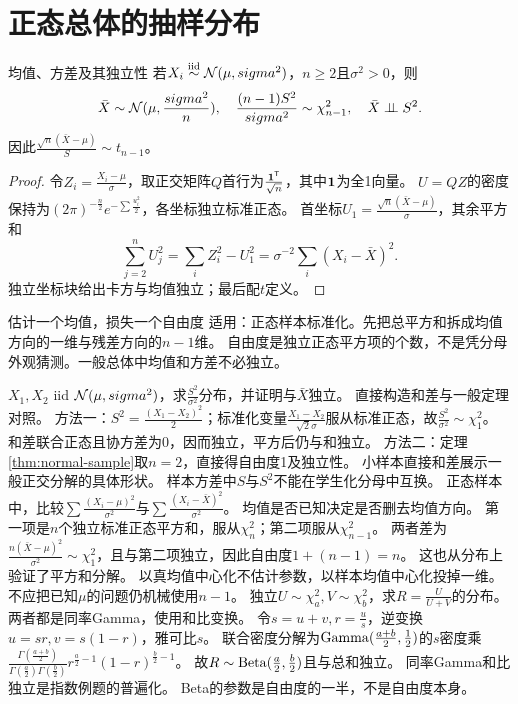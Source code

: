 \section{正态总体的抽样分布}\label{sec:63}
\begin{theorem}{均值、方差及其独立性}\label{thm:normal-sample}
若$X_i\overset{\mathrm{iid}}{\sim}\mathcal N(\mu,sigma^2)$，$n\ge2$且$\sigma^2>0$，则
\[\bar X\sim\mathcal N(\mu,\dfrac{sigma^2}{n}),\quad\dfrac{(n-1)S^2}{sigma^2}\sim\chi_{n-1}^2,
\quad\bar X\mathrel{\perp\!\!\!\perp} S^2.\]
因此$\frac{\sqrt n(\bar X-\mu)}{S}\sim t_{n-1}$。
\end{theorem}
\begin{proof}
令$Z_i=\frac{X_i-\mu}{\sigma}$，取正交矩阵$Q$首行为$\frac{\mathbf1^\mathsf T}{\sqrt n}$，其中$\mathbf1$为全1向量。
$U=QZ$的密度保持为$(2\pi)^{-\frac{n}{2}}e^{-\sum \frac{u_i^2}{2}}$，各坐标独立标准正态。
首坐标$U_1=\frac{\sqrt n(\bar X-\mu)}{\sigma}$，其余平方和
\[\sum_{j=2}^nU_j^2=\sum_iZ_i^2-U_1^2=\sigma^{-2}\sum_i(X_i-\bar X)^2.\]
独立坐标块给出卡方与均值独立；最后配$t$定义。
\end{proof}
\begin{method}{估计一个均值，损失一个自由度}
适用：正态样本标准化。先把总平方和拆成均值方向的一维与残差方向的$n-1$维。
自由度是独立正态平方项的个数，不是凭分母外观猜测。一般总体中均值和方差不必独立。
\end{method}
{$X_1,X_2$ iid $\mathcal N(\mu,sigma^2)$，求$\frac{S^2}{\sigma^2}$分布，并证明与$\bar X$独立。}
{直接构造和差与一般定理对照。}
{方法一：$S^2=\frac{(X_1-X_2)^2}{2}$；标准化变量$\frac{X_1-X_2}{\sqrt2\sigma}$服从标准正态，故$\frac{S^2}{\sigma^2}\sim\chi_1^2$。
和差联合正态且协方差为0，因而独立，平方后仍与和独立。
方法二：定理\ref{thm:normal-sample}取$n=2$，直接得自由度1及独立性。}
{小样本直接和差展示一般正交分解的具体形状。}
{样本方差中$S$与$S^2$不能在学生化分母中互换。}
{正态样本中，比较$\sum\frac{(X_i-\mu)^2}{\sigma^2}$与$\sum\frac{(X_i-\bar X)^2}{\sigma^2}$。}
{均值是否已知决定是否删去均值方向。}
{第一项是$n$个独立标准正态平方和，服从$\chi_n^2$；第二项服从$\chi_{n-1}^2$。
两者差为$\frac{n(\bar X-\mu)^2}{\sigma^2}\sim\chi_1^2$，且与第二项独立，因此自由度$1+(n-1)=n$。
这也从分布上验证了平方和分解。}
{以真均值中心化不估计参数，以样本均值中心化投掉一维。}
{不应把已知$\mu$的问题仍机械使用$n-1$。}
{独立$U\sim\chi_a^2,V\sim\chi_b^2$，求$R=\frac{U}{U+V}$的分布。}
{两者都是同率Gamma，使用和比变换。}
{令$s=u+v,r=\frac{u}{s}$，逆变换$u=sr,v=s(1-r)$，雅可比$s$。
联合密度分解为$\operatorname{Gamma}(\frac{a+b}{2},\frac{1}{2})$的$s$密度乘
$\frac{\Gamma(\frac{a+b}{2})}{\Gamma(\frac{a}{2})\Gamma(\frac{b}{2})}r^{\frac{a}{2}-1}(1-r)^{\frac{b}{2}-1}$。
故$R\sim\operatorname{Beta}(\frac{a}{2},\frac{b}{2})$且与总和独立。}
{同率Gamma和比独立是指数例题的普遍化。}
{Beta的参数是自由度的一半，不是自由度本身。}

